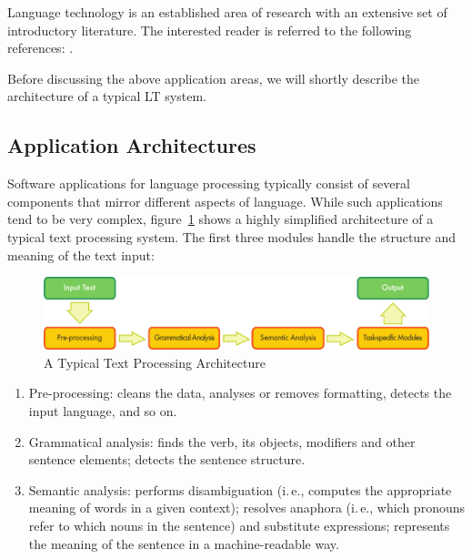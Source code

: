 \begin{multicols}{2}
Language technology is an established area of research with an extensive set of introductory literature. The interested reader is referred to the following references: \cite{carstensen-etal1, jurafsky-martin01, manning-schuetze1, lt-world1, lt-survey1}.

Before discussing the above application areas, we will shortly describe the architecture of a typical LT system.

\subsection{Application Architectures}

Software applications for language processing typically consist of several components that mirror different aspects of language.  While such applications tend to be very complex, figure~\ref{fig:textprocessingarch-eng} shows a highly simplified architecture of a typical text processing system. The first three modules handle the structure and meaning of the text input:

\begin{figure}[b]
  \center
  \includegraphics[width=\textwidth]{../_media/english/text_processing_app_architecture}
  \caption{A Typical Text Processing Architecture}
  \label{fig:textprocessingarch-eng}
\end{figure}

\begin{enumerate}
\item Pre-processing: cleans the data, analyses or removes formatting,
detects the input language, and so on.

\item Grammatical analysis: finds the verb, its objects, modifiers and
other sentence elements; detects the sentence structure.

\item Semantic analysis: performs disambiguation (i.\,e., computes the
appropriate meaning of words in a given context); resolves anaphora
(i.\,e., which pronouns refer to which nouns in the sentence) and
substitute expressions; represents the meaning of the sentence in
a machine-readable way.
\end{enumerate}


\end{multicols}

